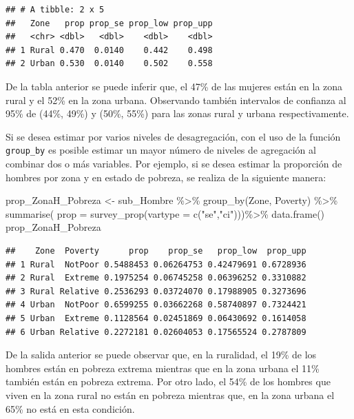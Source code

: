 \documentclass[
  12pt,
]{book}
\newenvironment{Shaded}{\begin{snugshade}}{\end{snugshade}}
\newcommand{\AttributeTok}[1]{\textcolor[rgb]{0.77,0.63,0.00}{#1}}
\newcommand{\FunctionTok}[1]{\textcolor[rgb]{0.00,0.00,0.00}{#1}}
\newcommand{\NormalTok}[1]{#1}
\newcommand{\OtherTok}[1]{\textcolor[rgb]{0.56,0.35,0.01}{#1}}
\newcommand{\SpecialCharTok}[1]{\textcolor[rgb]{0.00,0.00,0.00}{#1}}
\newcommand{\StringTok}[1]{\textcolor[rgb]{0.31,0.60,0.02}{#1}}
\begin{document}
\begin{verbatim}
## # A tibble: 2 x 5
##   Zone   prop prop_se prop_low prop_upp
##   <chr> <dbl>   <dbl>    <dbl>    <dbl>
## 1 Rural 0.470  0.0140    0.442    0.498
## 2 Urban 0.530  0.0140    0.502    0.558
\end{verbatim}

De la tabla anterior se puede inferir que, el 47\% de las mujeres están en la zona rural y el 52\% en la zona urbana. Observando también intervalos de confianza al 95\% de (44\%, 49\%) y (50\%, 55\%) para las zonas rural y urbana respectivamente.

Si se desea estimar por varios niveles de desagregación, con el uso de la función \texttt{group\_by} es posible estimar un mayor número de niveles de agregación al combinar dos o más variables. Por ejemplo, si se desea estimar la proporción de hombres por zona y en estado de pobreza, se realiza de la siguiente manera:

\begin{Shaded}
\begin{Highlighting}[]
\NormalTok{prop\_ZonaH\_Pobreza }\OtherTok{\textless{}{-}}\NormalTok{ sub\_Hombre }\SpecialCharTok{\%\textgreater{}\%}
                      \FunctionTok{group\_by}\NormalTok{(Zone, Poverty) }\SpecialCharTok{\%\textgreater{}\%} 
                      \FunctionTok{summarise}\NormalTok{(}
                      \AttributeTok{prop =} \FunctionTok{survey\_prop}\NormalTok{(}\AttributeTok{vartype =} \FunctionTok{c}\NormalTok{(}\StringTok{"se"}\NormalTok{,}\StringTok{"ci"}\NormalTok{)))}\SpecialCharTok{\%\textgreater{}\%}
                      \FunctionTok{data.frame}\NormalTok{()}
\NormalTok{prop\_ZonaH\_Pobreza}
\end{Highlighting}
\end{Shaded}

\begin{verbatim}
##    Zone  Poverty      prop    prop_se   prop_low  prop_upp
## 1 Rural  NotPoor 0.5488453 0.06264753 0.42479691 0.6728936
## 2 Rural  Extreme 0.1975254 0.06745258 0.06396252 0.3310882
## 3 Rural Relative 0.2536293 0.03724070 0.17988905 0.3273696
## 4 Urban  NotPoor 0.6599255 0.03662268 0.58740897 0.7324421
## 5 Urban  Extreme 0.1128564 0.02451869 0.06430692 0.1614058
## 6 Urban Relative 0.2272181 0.02604053 0.17565524 0.2787809
\end{verbatim}

De la salida anterior se puede observar que, en la ruralidad, el 19\% de los hombres están en pobreza extrema mientras que en la zona urbana el 11\% también están en pobreza extrema. Por otro lado, el 54\% de los hombres que viven en la zona rural no están en pobreza mientras que, en la zona urbana el 65\% no está en esta condición.
\end{document}
